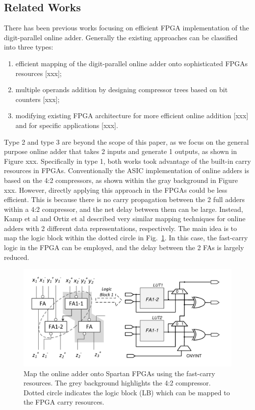 \documentclass[conference]{IEEEtran}
\begin{document}
\subsection{Related Works}
There has been previous works focusing on efficient FPGA implementation of the digit-parallel online adder. Generally the existing approaches can be classified into three types:%
\begin{enumerate}
	\item efficient mapping of the digit-parallel online adder onto sophisticated FPGAs resources [xxx];
	\item multiple operands addition by designing compressor trees based on bit counters [xxx];
	\item modifying existing FPGA architecture for more efficient online addition [xxx] and for specific applications [xxx].
\end{enumerate}

Type 2 and type 3 are beyond the scope of this paper, as we focus on the general purpose online adder that takes 2 inputs and generate 1 outputs, as shown in Figure xxx. Specifically in type 1, both works took advantage of the built-in carry resources in FPGAs. Conventionally the ASIC implementation of online adders is based on the 4:2 compressors, as shown within the gray background in Figure xxx. However, directly applying this approach in the FPGAs could be less efficient. This is because there is no carry propagation between the 2 full adders within a 4:2 compressor, and the net delay between them can be large. Instead, Kamp et al and Ortiz et al described very similar mapping techniques for online adders with 2 different data representations, respectively. The main idea is to map the logic block within the dotted circle in Fig.~\ref{Fig:PreviousWork}. In this case, the fast-carry logic in the FPGA can be employed, and the delay between the 2 FAs is largely reduced. 

\begin{figure}[htbp]
	\centering
	\includegraphics[width=.5\textwidth]{./Figures/SDAdder_42comp_Spartan.pdf}
	\caption{Map the online adder onto Spartan FPGAs using the fast-carry resources. The grey background highlights the 4:2 compressor. Dotted circle indicates the logic block (LB) which can be mapped to the FPGA carry resources.}
	\label{Fig:PreviousWork}
\end{figure}
\end{document}

